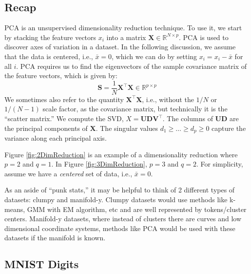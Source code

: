 \documentclass[a4paper]{article}
\begin{document}
\subsection{Recap}
PCA is an unsupervised dimensionality reduction technique. To use it, we start by stacking the feature vectors ${x_i}$ into a matrix $\mathbf{X}\in \mathbb{R}^{N\times p}$. PCA is used to discover axes of variation in a dataset. In the following discussion, we assume that the data is centered, i.e., $\bar{x}=0$, which we can do by setting $x_i = x_i -\bar{x}$ for all $i$. PCA requires us to find the eigenvectors of the sample covariance matrix of the feature vectors, which is given by: $$\mathbf{S} = \frac{1}{N}\mathbf{X}^\top\mathbf{X}\in\mathbb{R}^{p\times p}$$
We sometimes also refer to the quantity $\mathbf{X}^\top\mathbf{X}$, i.e., without the $1/N$ or $1/(N-1)$ scale factor, as the covariance matrix, but technically it is the ``scatter matrix.''
We compute the SVD, $X=\mathbf{U}\mathbf{D}\mathbf{V}^\top$. The columns of $\mathbf{UD}$ are the principal components of $\mathbf{X}$. The singular values $d_1 \geq \ldots \geq d_p \geq 0$ capture the variance along each principal axis.

Figure \ref{fig:2DimReduction} is an example of a dimensionality reduction where $p=2$ and $q=1$. In Figure \ref{fig:3DimReduction}, $p=3$ and $q=2$. 
For simplicity, assume we have a \textit{centered} set of data, i.e., $\bar{x}=0$.

As an aside of ``punk stats,'' it may be helpful to think of 2 different types of datasets: clumpy and manifold-y. Clumpy datasets would use methods like k-means, GMM with EM algorithm, etc and are well represented by tokens/cluster centers.  Manifold-y datasets, where instead of clusters there are curves and low dimensional coordinate systems, methods like PCA would be used with these datasets if the manifold is known. 

\subsection{MNIST Digits}
\end{document}
